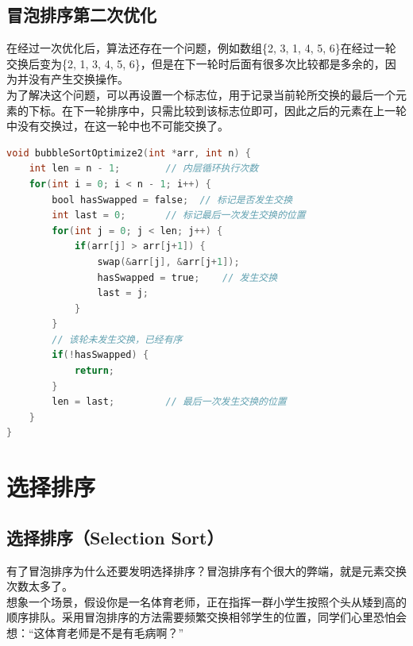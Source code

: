 \vspace{0.5cm}

\subsection{冒泡排序第二次优化}

在经过一次优化后，算法还存在一个问题，例如数组\{2, 3, 1, 4, 5, 6\}在经过一轮交换后变为\{2, 1, 3, 4, 5, 6\}，但是在下一轮时后面有很多次比较都是多余的，因为并没有产生交换操作。\\

为了解决这个问题，可以再设置一个标志位，用于记录当前轮所交换的最后一个元素的下标。在下一轮排序中，只需比较到该标志位即可，因此之后的元素在上一轮中没有交换过，在这一轮中也不可能交换了。\\


\begin{lstlisting}[language=C]
void bubbleSortOptimize2(int *arr, int n) {
    int len = n - 1;        // 内层循环执行次数
    for(int i = 0; i < n - 1; i++) {
        bool hasSwapped = false;  // 标记是否发生交换
        int last = 0;       // 标记最后一次发生交换的位置
        for(int j = 0; j < len; j++) {
            if(arr[j] > arr[j+1]) {
                swap(&arr[j], &arr[j+1]);
                hasSwapped = true;    // 发生交换
                last = j;
            }
        }
        // 该轮未发生交换，已经有序
        if(!hasSwapped) {
            return;
        }
        len = last;         // 最后一次发生交换的位置
    }
}
\end{lstlisting}

\newpage

\section{选择排序}

\subsection{选择排序（Selection Sort）}

有了冒泡排序为什么还要发明选择排序？冒泡排序有个很大的弊端，就是元素交换次数太多了。\\

想象一个场景，假设你是一名体育老师，正在指挥一群小学生按照个头从矮到高的顺序排队。采用冒泡排序的方法需要频繁交换相邻学生的位置，同学们心里恐怕会想：“这体育老师是不是有毛病啊？”\\

